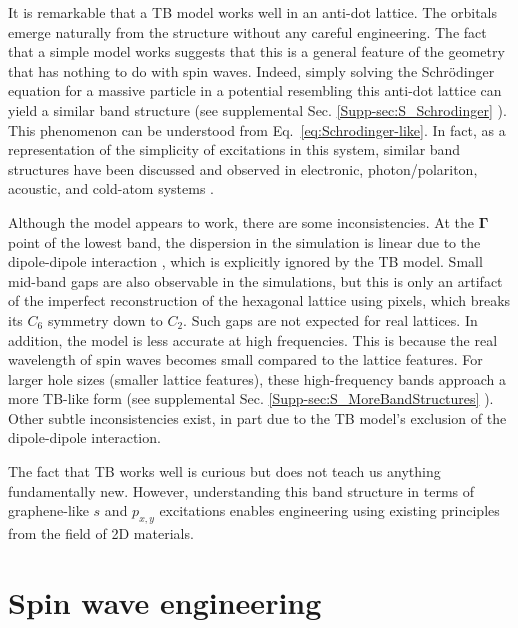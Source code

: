 \documentclass[aps,prx,twocolumn,superscriptaddress,floatfix]{revtex4-2}
\begin{document}
It is remarkable that a TB model works well in an anti-dot lattice. The orbitals emerge naturally from the structure without any careful engineering. The fact that a simple model works suggests that this is a general feature of the geometry that has nothing to do with spin waves. Indeed, simply solving the Schr{\"o}dinger equation for a massive particle in a potential resembling this anti-dot lattice can yield a similar band structure (see supplemental Sec. \ref{Supp-sec:S_Schrodinger} \cite{Supplemental}). This phenomenon can be understood from Eq.~\ref{eq:Schrodinger-like}. In fact, as a representation of the simplicity of excitations in this system, similar band structures have been discussed and observed in electronic, photon/polariton, acoustic, and cold-atom systems \cite{milicevic_type-iii_2019, gao_visualization_2024, wu_p_xy-orbital_2008, polini_artificial_2013, mangussi_multi-orbital_2020, ding_experimental_2019}.

Although the model appears to work, there are some inconsistencies. At the $\mathbf{\Gamma}$ point of the lowest band, the dispersion in the simulation is linear due to the dipole-dipole interaction \cite{stancil_magnetostatic_2009}, which is explicitly ignored by the TB model. Small mid-band gaps are also observable in the simulations, but this is only an artifact of the imperfect reconstruction of the hexagonal lattice using pixels, which breaks its $C_6$ symmetry down to $C_2$. Such gaps are not expected for real lattices. In addition, the model is less accurate at high frequencies. This is because the real wavelength of spin waves becomes small compared to the lattice features. For larger hole sizes (smaller lattice features), these high-frequency bands approach a more TB-like form (see supplemental Sec. \ref{Supp-sec:S_MoreBandStructures} \cite{Supplemental}). Other subtle inconsistencies exist, in part due to the TB model's exclusion of the dipole-dipole interaction.

The fact that TB works well is curious but does not teach us anything fundamentally new. However, understanding this band structure in terms of graphene-like $s$ and $p_{x,y}$ excitations enables engineering using existing principles from the field of 2D materials. 

\section{Spin wave engineering}
\end{document}
